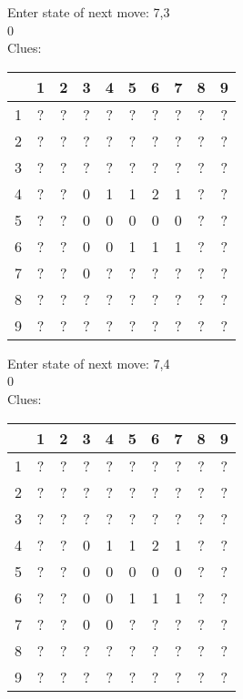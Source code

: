 Enter state of next move: 7,3\\
0\\
Clues:\\
\begin{tabular}{|c|c|c|c|c|c|c|c|c|c|}
\hline
  & 1 & 2 & 3 & 4 & 5 & 6 & 7 & 8 & 9\\
\hline
1 & ? & ? & ? & ? & ? & ? & ? & ? & ?\\
\hline
2 & ? & ? & ? & ? & ? & ? & ? & ? & ?\\
\hline
3 & ? & ? & ? & ? & ? & ? & ? & ? & ?\\
\hline
4 & ? & ? & 0 & 1 & 1 & 2 & 1 & ? & ?\\
\hline
5 & ? & ? & 0 & 0 & 0 & 0 & 0 & ? & ?\\
\hline
6 & ? & ? & 0 & 0 & 1 & 1 & 1 & ? & ?\\
\hline
7 & ? & ? & 0 & ? & ? & ? & ? & ? & ?\\
\hline
8 & ? & ? & ? & ? & ? & ? & ? & ? & ?\\
\hline
9 & ? & ? & ? & ? & ? & ? & ? & ? & ?\\
\hline
\end{tabular}

Enter state of next move: 7,4\\
0\\
Clues:\\
\begin{tabular}{|c|c|c|c|c|c|c|c|c|c|}
\hline
  & 1 & 2 & 3 & 4 & 5 & 6 & 7 & 8 & 9\\
\hline
1 & ? & ? & ? & ? & ? & ? & ? & ? & ?\\
\hline
2 & ? & ? & ? & ? & ? & ? & ? & ? & ?\\
\hline
3 & ? & ? & ? & ? & ? & ? & ? & ? & ?\\
\hline
4 & ? & ? & 0 & 1 & 1 & 2 & 1 & ? & ?\\
\hline
5 & ? & ? & 0 & 0 & 0 & 0 & 0 & ? & ?\\
\hline
6 & ? & ? & 0 & 0 & 1 & 1 & 1 & ? & ?\\
\hline
7 & ? & ? & 0 & 0 & ? & ? & ? & ? & ?\\
\hline
8 & ? & ? & ? & ? & ? & ? & ? & ? & ?\\
\hline
9 & ? & ? & ? & ? & ? & ? & ? & ? & ?\\
\hline
\end{tabular}

